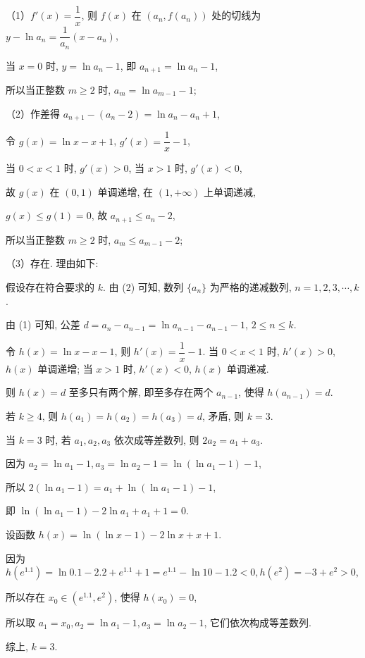 \begin{solutions}
（1）$f'(x) = \dfrac{1}{x}$, 则 $f(x)$ 在 $(a_n, f(a_n))$ 处的切线为 $y - \ln a_n = \dfrac{1}{a_n} (x - a_n)$,

当 $x=0$ 时, $y = \ln a_n - 1$, 即 $a_{n+1} = \ln a_n - 1$,

所以当正整数 $m \ge 2$ 时, $a_m = \ln a_{m-1} - 1$;

（2）作差得 $a_{n+1} - (a_n - 2) = \ln a_n - a_n + 1$,

令 $g(x) = \ln x - x + 1$, $g'(x) = \dfrac{1}{x} - 1$,

当 $0 < x < 1$ 时, $g'(x) > 0$, 当 $x > 1$ 时, $g'(x) < 0$,

故 $g(x)$ 在 $(0, 1)$ 单调递增, 在 $(1, +\infty)$ 上单调递减,

$g(x) \le g(1) = 0$, 故 $a_{n+1} \le a_n - 2$,

所以当正整数 $m \ge 2$ 时, $a_m \le a_{m-1} - 2$;

（3）存在. 理由如下:

假设存在符合要求的 $k$. 由 (2) 可知, 数列 $\{a_n\}$ 为严格的递减数列, $n=1,2,3,\cdots,k$.

由 (1) 可知, 公差 $d = a_n - a_{n-1} = \ln a_{n-1} - a_{n-1} - 1$, $2 \leqslant n \leqslant k$.

令 $h(x) = \ln x - x - 1$, 则 $h'(x) = \dfrac{1}{x} - 1$. 当 $0 < x < 1$ 时, $h'(x) > 0$, $h(x)$ 单调递增; 当 $x > 1$ 时, $h'(x) < 0$, $h(x)$ 单调递减.

则 $h(x) = d$ 至多只有两个解, 即至多存在两个 $a_{n-1}$, 使得 $h(a_{n-1}) = d$.

若 $k \geqslant 4$, 则 $h(a_1) = h(a_2) = h(a_3) = d$, 矛盾, 则 $k = 3$.

当 $k = 3$ 时, 若 $a_1, a_2, a_3$ 依次成等差数列, 则 $2a_2 = a_1 + a_3$.

因为 $a_2 = \ln a_1 - 1, a_3 = \ln a_2 - 1 = \ln(\ln a_1 - 1) - 1$,

所以 $2(\ln a_1 - 1) = a_1 + \ln(\ln a_1 - 1) - 1$,

即 $\ln(\ln a_1 - 1) - 2\ln a_1 + a_1 + 1 = 0$.

设函数 $h(x) = \ln(\ln x - 1) - 2\ln x + x + 1$.

因为 $h(e^{1.1}) = \ln 0.1 - 2.2 + e^{1.1} + 1 = e^{1.1} - \ln 10 - 1.2 < 0, h(e^2) = -3 + e^2 > 0$,

所以存在 $x_0 \in (e^{1.1}, e^2)$, 使得 $h(x_0) = 0$,

所以取 $a_1 = x_0, a_2 = \ln a_1 - 1, a_3 = \ln a_2 - 1$, 它们依次构成等差数列.

综上, $k = 3$.


\end{solutions}

